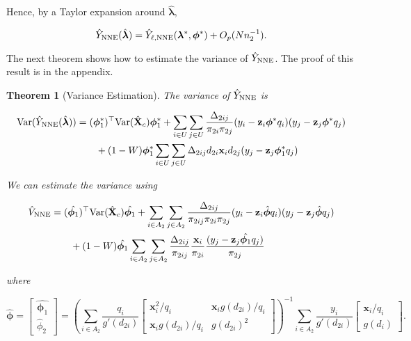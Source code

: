 \documentclass[12pt]{article}
\newtheorem{theorem}{Theorem}
\newcommand{\Var}{{\text{Var}}}
\renewcommand{\bf}[1]{\mathbf{#1}}
\begin{document}
Hence, by a Taylor expansion around $\hat{\bm \lambda}$,

$$\hat Y_{\rm NNE}(\hat{\bm \lambda}) = \hat Y_{\ell, \rm NNE}(\bm \lambda^*, 
\bm \phi^*) + O_p(Nn_2^{-1}).$$

The next theorem shows how to estimate the variance of $\hat Y_{\rm NNE}$.
The proof of this result is in the appendix.

\begin{theorem}[Variance Estimation]\label{thm:nnve}
  The variance of $\hat Y_{\rm NNE}$ is 

  \begin{align*}
    \Var(\hat Y_{\rm NNE}(\hat{\bm \lambda}))
    &= (\bm \phi_1^*)^\top \Var(\hat{\bf X}_c) \bm \phi_1^* + 
    \sum_{i \in U} \sum_{j \in U} \frac{\Delta_{2ij}}{\pi_{2i}\pi_{2j}} 
      (y_i - \bf z_i \bm \phi^* q_i)(y_j - \bf z_j \bm \phi^* q_j)\\
    &\qquad + (1 - W)\bm \phi_1^* \sum_{i \in U} \sum_{j \in U} \Delta_{2ij}
    d_{2i} \bf x_i d_{2j}(y_j - \bf z_j \bm \phi^*_1 q_j)\\
  \end{align*}

  We can estimate the variance using

  \begin{align*}
    \hat V_{\rm NNE} 
    &= (\hat{\bm \phi_1})^\top \Var(\hat{\bf X}_c) \hat{\bm \phi_1} + 
    \sum_{i \in A_2} \sum_{j \in A_2} \frac{\Delta_{2ij}}{\pi_{2ij}\pi_{2i}\pi_{2j}} 
    (y_i - \bf z_i \hat{\bm \phi} q_i)(y_j - \bf z_j \hat{\bm \phi} q_j) \\
    &\qquad + (1 - W)\hat{\bm \phi_1} \sum_{i \in A_2} \sum_{j \in A_2} \frac{\Delta_{2ij}}{\pi_{2ij}}
    \frac{\bf x_i}{\pi_{2i}} \frac{(y_j - \bf z_j \hat{\bm \phi_1} q_j)}{\pi_{2j}}
  \end{align*}

  where 
  
  $$\hat{\bm \phi} =
  \begin{bmatrix}
    \hat{\bm \phi_1} \\ \hat \phi_2
  \end{bmatrix} = 
  \left(\sum_{i \in A_2} \frac{q_i}{g'(d_{2i})} 
  \begin{bmatrix}
    \bf x_i^2 / q_i & \bf x_i g(d_{2i}) / q_i \\
    \bf x_i g(d_{2i}) / q_i & g(d_{2i})^2
  \end{bmatrix}
  \right)^{-1}
  \sum_{i \in A_2} \frac{y_i}{g'(d_{2i})} 
  \begin{bmatrix} \bf x_i / q_i \\ g(d_i) \end{bmatrix}.
  $$
\end{theorem}
\end{document}
